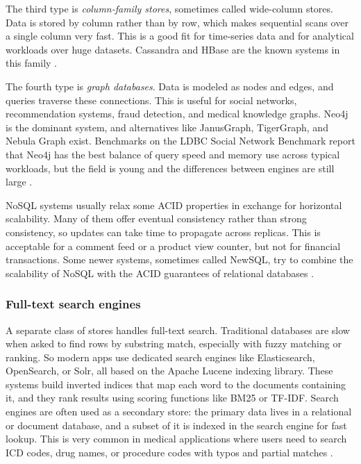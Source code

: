 The third type is \emph{column-family stores}, sometimes called wide-column stores. Data is stored by column rather than by row, which makes sequential scans over a single column very fast. This is a good fit for time-series data and for analytical workloads over huge datasets. Cassandra and HBase are the known systems in this family \autocite{gajiwala2024nosql_review, kumar2018nosql_traditional}.

The fourth type is \emph{graph databases}. Data is modeled as nodes and edges, and queries traverse these connections. This is useful for social networks, recommendation systems, fraud detection, and medical knowledge graphs. Neo4j is the dominant system, and alternatives like JanusGraph, TigerGraph, and Nebula Graph exist. Benchmarks on the LDBC Social Network Benchmark report that Neo4j has the best balance of query speed and memory use across typical workloads, but the field is young and the differences between engines are still large \autocite{monteiro2023graphdb, santos2024graphdb, besta2023graphdb}.

NoSQL systems usually relax some ACID properties in exchange for horizontal scalability. Many of them offer eventual consistency rather than strong consistency, so updates can take time to propagate across replicas. This is acceptable for a comment feed or a product view counter, but not for financial transactions. Some newer systems, sometimes called NewSQL, try to combine the scalability of NoSQL with the ACID guarantees of relational databases \autocite{patel2025newsql_multimodel, khan2022sqlnosql}.

\subsubsection{Full-text search engines}
\label{sec:search-engines}

A separate class of stores handles full-text search. Traditional databases are slow when asked to find rows by substring match, especially with fuzzy matching or ranking. So modern apps use dedicated search engines like Elasticsearch, OpenSearch, or Solr, all based on the Apache Lucene indexing library. These systems build inverted indices that map each word to the documents containing it, and they rank results using scoring functions like BM25 or TF-IDF. Search engines are often used as a secondary store: the primary data lives in a relational or document database, and a subset of it is indexed in the search engine for fast lookup. This is very common in medical applications where users need to search ICD codes, drug names, or procedure codes with typos and partial matches \autocite{wen2019elasticsearch}.

